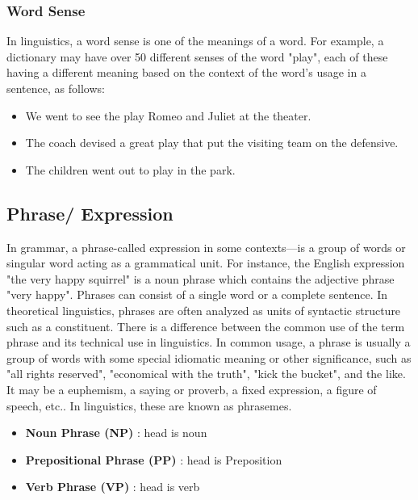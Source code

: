 \subsubsection{Word Sense \cite{wiki-word-sense}}\label{word-sense}
In linguistics, a word sense is one of the meanings of a word. For example, a dictionary may have over 50 different senses of the word "play", each of these having a different meaning based on the context of the word's usage in a sentence, as follows:

\begin{itemize}
    \item We went to see the play Romeo and Juliet at the theater.
    \item The coach devised a great play that put the visiting team on the defensive.
    \item The children went out to play in the park.
\end{itemize}




\subsection{Phrase/ Expression \cite{wiki-phrase}}\label{Language: Phrase/ Expression}
In grammar, a phrase-called expression in some contexts—is a group of words or singular word acting as a grammatical unit. For instance, the English expression "the very happy squirrel" is a noun phrase which contains the adjective phrase "very happy". Phrases can consist of a single word or a complete sentence. In theoretical linguistics, phrases are often analyzed as units of syntactic structure such as a constituent. There is a difference between the common use of the term phrase and its technical use in linguistics. In common usage, a phrase is usually a group of words with some special idiomatic meaning or other significance, such as "all rights reserved", "economical with the truth", "kick the bucket", and the like. It may be a euphemism, a saying or proverb, a fixed expression, a figure of speech, etc.. In linguistics, these are known as phrasemes.

\begin{itemize}
    \item \textbf{Noun Phrase (NP)} : head is noun
    \item \textbf{Prepositional Phrase (PP)} : head is Preposition
    \item \textbf{Verb Phrase (VP)} : head is verb
\end{itemize}

